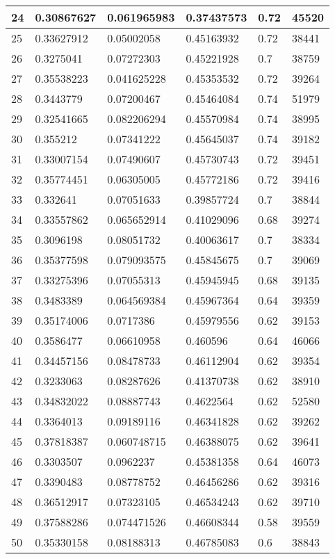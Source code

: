 \begin{longtable}{|l|l|l|l|l|l|}
24 & 0.30867627 & 0.061965983 & 0.37437573 & 0.72 & 45520 \\ \hline 
25 & 0.33627912 & 0.05002058 & 0.45163932 & 0.72 & 38441 \\ \hline 
26 & 0.3275041 & 0.07272303 & 0.45221928 & 0.7 & 38759 \\ \hline 
27 & 0.35538223 & 0.041625228 & 0.45353532 & 0.72 & 39264 \\ \hline 
28 & 0.3443779 & 0.07200467 & 0.45464084 & 0.74 & 51979 \\ \hline 
29 & 0.32541665 & 0.082206294 & 0.45570984 & 0.74 & 38995 \\ \hline 
30 & 0.355212 & 0.07341222 & 0.45645037 & 0.74 & 39182 \\ \hline 
31 & 0.33007154 & 0.07490607 & 0.45730743 & 0.72 & 39451 \\ \hline 
32 & 0.35774451 & 0.06305005 & 0.45772186 & 0.72 & 39416 \\ \hline 
33 & 0.332641 & 0.07051633 & 0.39857724 & 0.7 & 38844 \\ \hline 
34 & 0.33557862 & 0.065652914 & 0.41029096 & 0.68 & 39274 \\ \hline 
35 & 0.3096198 & 0.08051732 & 0.40063617 & 0.7 & 38334 \\ \hline 
36 & 0.35377598 & 0.079093575 & 0.45845675 & 0.7 & 39069 \\ \hline 
37 & 0.33275396 & 0.07055313 & 0.45945945 & 0.68 & 39135 \\ \hline 
38 & 0.3483389 & 0.064569384 & 0.45967364 & 0.64 & 39359 \\ \hline 
39 & 0.35174006 & 0.0717386 & 0.45979556 & 0.62 & 39153 \\ \hline 
40 & 0.3586477 & 0.06610958 & 0.460596 & 0.64 & 46066 \\ \hline 
41 & 0.34457156 & 0.08478733 & 0.46112904 & 0.62 & 39354 \\ \hline 
42 & 0.3233063 & 0.08287626 & 0.41370738 & 0.62 & 38910 \\ \hline 
43 & 0.34832022 & 0.08887743 & 0.4622564 & 0.62 & 52580 \\ \hline 
44 & 0.3364013 & 0.09189116 & 0.46341828 & 0.62 & 39262 \\ \hline 
45 & 0.37818387 & 0.060748715 & 0.46388075 & 0.62 & 39641 \\ \hline 
46 & 0.3303507 & 0.0962237 & 0.45381358 & 0.64 & 46073 \\ \hline 
47 & 0.3390483 & 0.08778752 & 0.46456286 & 0.62 & 39316 \\ \hline 
48 & 0.36512917 & 0.07323105 & 0.46534243 & 0.62 & 39710 \\ \hline 
49 & 0.37588286 & 0.074471526 & 0.46608344 & 0.58 & 39559 \\ \hline 
50 & 0.35330158 & 0.08188313 & 0.46785083 & 0.6 & 38843 \\ \hline 
\end{longtable}